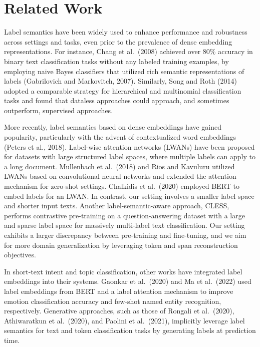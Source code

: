 \documentclass[11pt]{article}
\begin{document}
\section{Related Work}

Label semantics have been widely used to enhance performance and robustness
across settings and tasks, even prior to the prevalence of dense embedding
representations. For instance, Chang et al.\ (2008) achieved over 80\%
accuracy in binary text classification tasks without any labeled training
examples, by employing naive Bayes classifiers that utilized rich semantic
representations of labels (Gabrilovich and Markovitch, 2007). Similarly,
Song and Roth (2014) adopted a comparable strategy for hierarchical and
multinomial classification tasks and found that dataless approaches could
approach, and sometimes outperform, supervised approaches.

More recently, label semantics based on dense embeddings have gained
popularity, particularly with the advent of contextualized word embeddings
(Peters et al., 2018). Label-wise attention networks (LWANs) have been
proposed for datasets with large structured label spaces, where multiple
labels can apply to a long document. Mullenbach et al.\ (2018) and Rios and
Kavuluru utilized LWANs based on convolutional neural networks and extended
the attention mechanism for zero-shot settings. Chalkidis et al.\ (2020)
employed BERT to embed labels for an LWAN. In contrast, our setting involves
a smaller label space and shorter input texts. Another label-semantic-aware
approach, CLESS, performs contrastive pre-training on a question-answering
dataset with a large and sparse label space for massively multi-label text
classification. Our setting exhibits a larger discrepancy between
pre-training and fine-tuning, and we aim for more domain generalization by
leveraging token and span reconstruction objectives.

In short-text intent and topic classification, other works have integrated
label embeddings into their systems. Gaonkar et al.\ (2020) and Ma et al.\
(2022) used label embeddings from BERT and a label attention mechanism to
improve emotion classification accuracy and few-shot named entity
recognition, respectively. Generative approaches, such as those of Rongali
et al.\ (2020), Athiwaratkun et al.\ (2020), and Paolini et al.\ (2021),
implicitly leverage label semantics for text and token classification tasks
by generating labels at prediction time.
\end{document}
